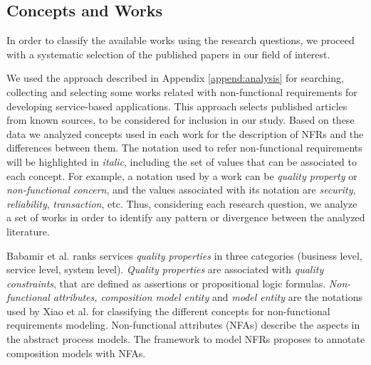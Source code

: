 
 
\subsection{Concepts and Works}
\label{subsec:nfr_concepts}

In order to classify the available works using the research questions, we
proceed with a systematic selection of the published papers in our field of
interest.

We used the approach described in Appendix \ref{append:analysis} for searching,
collecting and selecting some works related with non-functional requirements for
developing service-based applications. This approach selects published articles
from known sources,  to be considered for inclusion in our study. Based on these data we analyzed concepts used in each work for the description of NFRs and the
differences between them. The notation used to refer non-functional
requirements will be highlighted in \textit{italic}, including the set of values
that can be associated to each concept. For example, a notation used by a work
can be \textit{quality property} or \textit{non-functional concern}, and the values associated with
its notation are \textit{security}, \textit{reliability}, \textit{transaction},
etc. Thus, considering each research question, we analyze a set of works in
order to identify any pattern or divergence between the analyzed literature. 


\bigskip
\bigskip

Babamir et al.\cite{Babamir2010} ranks services \textit{quality properties}
in three categories (business level, service level, system level).
\textit{Quality properties} are associated with \textit{quality constraints},
that are defined as assertions or propositional logic formulas.
\textit{Non-functional attributes, composition model entity} and \textit{model entity} are the notations used by
Xiao et al. \cite{XiaoCZBOLH08} for classifying the different concepts for
non-functional requirements modeling. Non-functional attributes (NFAs) describe
the  aspects in the abstract process models. The
framework to model NFRs proposes to annotate composition models with NFAs.

